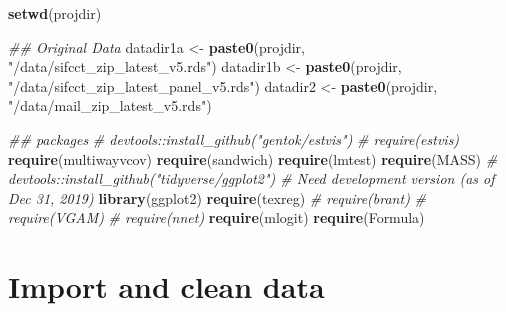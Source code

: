 \documentclass[
]{article}
\newenvironment{Shaded}{\begin{snugshade}}{\end{snugshade}}
\newcommand{\CommentTok}[1]{\textcolor[rgb]{0.56,0.35,0.01}{\textit{#1}}}
\newcommand{\KeywordTok}[1]{\textcolor[rgb]{0.13,0.29,0.53}{\textbf{#1}}}
\newcommand{\NormalTok}[1]{#1}
\newcommand{\StringTok}[1]{\textcolor[rgb]{0.31,0.60,0.02}{#1}}
\begin{document}
\begin{Shaded}
\begin{Highlighting}[]
\KeywordTok{setwd}\NormalTok{(projdir)}

\CommentTok{## Original Data}
\NormalTok{datadir1a <-}\StringTok{ }\KeywordTok{paste0}\NormalTok{(projdir, }\StringTok{"/data/sifcct_zip_latest_v5.rds"}\NormalTok{)}
\NormalTok{datadir1b <-}\StringTok{ }\KeywordTok{paste0}\NormalTok{(projdir, }\StringTok{"/data/sifcct_zip_latest_panel_v5.rds"}\NormalTok{)}
\NormalTok{datadir2 <-}\StringTok{ }\KeywordTok{paste0}\NormalTok{(projdir, }\StringTok{"/data/mail_zip_latest_v5.rds"}\NormalTok{)}

\CommentTok{## packages}
\CommentTok{# devtools::install_github("gentok/estvis")}
\CommentTok{# require(estvis)}
\KeywordTok{require}\NormalTok{(multiwayvcov)}
\KeywordTok{require}\NormalTok{(sandwich)}
\KeywordTok{require}\NormalTok{(lmtest)}
\KeywordTok{require}\NormalTok{(MASS)}
\CommentTok{# devtools::install_github("tidyverse/ggplot2") # Need development version (as of Dec 31, 2019)}
\KeywordTok{library}\NormalTok{(ggplot2)}
\KeywordTok{require}\NormalTok{(texreg)}
\CommentTok{# require(brant)}
\CommentTok{# require(VGAM)}
\CommentTok{# require(nnet)}
\KeywordTok{require}\NormalTok{(mlogit)}
\KeywordTok{require}\NormalTok{(Formula)}
\end{Highlighting}
\end{Shaded}

\hypertarget{import-and-clean-data}{%
\section{Import and clean data}\label{import-and-clean-data}}
\end{document}
